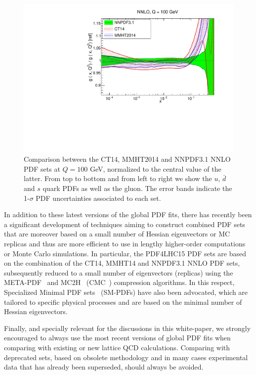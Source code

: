 \begin{figure}[t]
\begin{center}
   \includegraphics[scale=0.35]{plots/xg-31-nnlo-globalfits.pdf}
  \caption{\small Comparison between the CT14, MMHT2014
  and NNPDF3.1 NNLO PDF sets at $Q=100$ GeV, normalized
  to the central value of the latter.
  From top to bottom and from left to right we show the
  $u$, $\bar{d}$ and $s$ quark PDFs as well as the gluon.
  The error bands indicate the 1-$\sigma$ PDF uncertainties
  associated to each set.
    \label{fig:globalfits}
  }
\end{center}
\end{figure}

In addition to these latest versions of the global PDF fits,
there has recently been a significant development of techniques aiming
to construct combined PDF sets that are moreover based on
a small number of Hessian eigenvectors or MC replicas and thus
are more efficient to use in lengthy higher-order
computations or Monte Carlo simulations.
%
In particular, the PDF4LHC15 PDF sets are based on the
combination of the CT14, MMHT14 and NNPDF3.1 NNLO PDF sets,
subsequently reduced to a small number of eigenvectors
(replicas) using the META-PDF~\cite{Gao:2013bia}
and MC2H~\cite{Carrazza:2015aoa}
(CMC~\cite{Carrazza:2015hva}) compression algorithms.
%
In this respect, Specialized Minimal PDF sets~\cite{Carrazza:2016htc}
(SM-PDFs) have also
been advocated, which
are tailored to specific physical processes and are based
on the minimal number of Hessian eigenvectors.

Finally, and specially relevant for the discussions in this white-paper,
we strongly encouraged to always use the most recent versions
of global PDF fits when comparing with existing or new
lattice QCD calculations.
%
Comparing with deprecated sets, based on obsolete methodology
and in many cases experimental data that has already been
superseded, should always be avoided.
